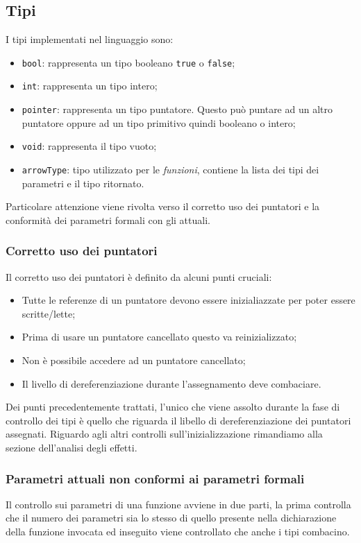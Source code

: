 \documentclass[../../main]{subfiles}
\begin{document}
\subsection{Tipi}
I tipi implementati nel linguaggio sono:
\begin{itemize}
    \item \verb|bool|: rappresenta un tipo booleano \verb|true| o \verb|false|;
    \item \verb|int|: rappresenta un tipo intero;
    \item \verb|pointer|: rappresenta un tipo puntatore. Questo può puntare ad un altro puntatore oppure ad un tipo primitivo quindi booleano o intero;
    \item \verb|void|: rappresenta il tipo vuoto;
    \item \verb|arrowType|: tipo utilizzato per le \textit{funzioni}, contiene la lista dei tipi dei parametri e il tipo ritornato.
\end{itemize}

Particolare attenzione viene rivolta verso il corretto uso dei puntatori e la conformità dei parametri formali con gli attuali.
\subsubsection{Corretto uso dei puntatori}
Il corretto uso dei puntatori è definito da alcuni punti cruciali:
\begin{itemize}
    \item Tutte le referenze di un puntatore devono essere inizialiazzate per poter essere scritte/lette;
    \item Prima di usare un puntatore cancellato questo va reinizializzato;
    \item Non è possibile accedere ad un puntatore cancellato;
    \item Il livello di dereferenziazione durante l'assegnamento deve combaciare.
\end{itemize}
Dei punti precedentemente trattati, l'unico che viene assolto durante la fase di controllo dei tipi è quello che riguarda il libello di dereferenziazione dei puntatori assegnati. Riguardo agli altri controlli sull'inizializzazione rimandiamo alla sezione dell'analisi degli effetti.
\subsubsection{Parametri attuali non conformi ai parametri formali}
Il controllo sui parametri di una funzione avviene in due parti, la prima controlla che il numero dei parametri sia lo stesso di quello presente
nella dichiarazione della funzione invocata ed inseguito viene controllato che anche i tipi combacino.
\end{document}
